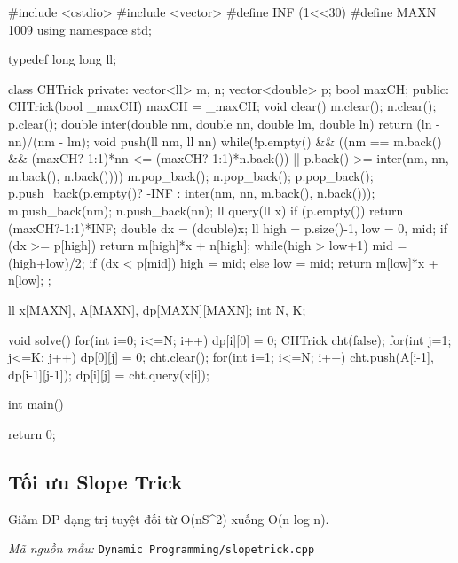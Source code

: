 \documentclass[11pt]{article}
\newcommand{\codepath}[1]{\par\noindent\textit{Mã nguồn mẫu:} \texttt{#1}\par}
\begin{document}
\begingroup\scriptsize
\begin{vncode}
#include <cstdio>
#include <vector>
#define INF (1<<30)
#define MAXN 1009
using namespace std;

typedef long long ll;

class CHTrick{
private:
    vector<ll> m, n;
    vector<double> p;
    bool maxCH;
public:
    CHTrick(bool _maxCH) { maxCH = _maxCH; }
    void clear() {
        m.clear(); n.clear(); p.clear();
    }
    double inter(double nm, double nn, double lm, double ln) {
        return (ln - nn)/(nm - lm);
    }
    void push(ll nm, ll nn) {
        while(!p.empty() &&
            ((nm == m.back() && (maxCH?-1:1)*nn <= (maxCH?-1:1)*n.back()) ||
            p.back() >= inter(nm, nn, m.back(), n.back()))) {
            m.pop_back(); n.pop_back(); p.pop_back();
        }
        p.push_back(p.empty()? -INF : inter(nm, nn,
            m.back(), n.back()));
        m.push_back(nm); n.push_back(nn);
    }
    ll query(ll x) {
        if (p.empty()) return (maxCH?-1:1)*INF;
        double dx = (double)x;
        ll high = p.size()-1, low = 0, mid;
        if (dx >= p[high]) return m[high]*x + n[high];
        while(high > low+1) {
            mid = (high+low)/2;
            if (dx < p[mid]) high = mid;
            else low = mid;
        }
        return m[low]*x + n[low];
    }
};

ll x[MAXN], A[MAXN], dp[MAXN][MAXN];
int N, K;

void solve() {
    for(int i=0; i<=N; i++) dp[i][0] = 0;
    CHTrick cht(false);        
    for(int j=1; j<=K; j++) {
        dp[0][j] = 0;
        cht.clear();
        for(int i=1; i<=N; i++) {
            cht.push(A[i-1], dp[i-1][j-1]);
            dp[i][j] = cht.query(x[i]);
        }
    }
}

int main() {
    
    return 0;
}
\end{vncode}
\endgroup


\subsection{Tối ưu Slope Trick}

Giảm DP dạng trị tuyệt đối từ O(nS\textasciicircum{}2) xuống O(n log n).

\codepath{Dynamic Programming/slopetrick.cpp}
\end{document}
